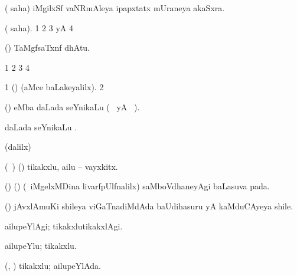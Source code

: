 \bentry
{} 
\gl{\nA}
\bmng
( saha) iMgilxSf vaNRmAleya ipapxtatx mUraneya akaSxra. 
\emng
\eentry

\bentry
{}
\gl{\saMkiSx}
\expl{}
\bmng
( saha). 
\bnum
\num{1}  
\num{2}  
\num{3}  yA  
\num{4}  
\enum
\emng
\eentry

\bentry
{}
\gl{\saMkeV}
\expl{}
\bmng
(\ravi) TaMgfsaTxnf dhAtu. 
\emng
\eentry

\bentry
{}
\gl{\saMkiSx}
\expl{}
\bmng
\bnum
\num{1}  
\num{2}  
\num{3}  
\num{4}  
\enum
\emng
\eentry


\bentry
{}
\gl{\saMkiSx}
\expl{}
\bmng
\bnum
\num{1} (\ame)  (aMce baLakeyalilx). 
\num{2} 
\enum
\emng
\eentry


\bentry
{} 
\gl{\nA}
\expl{}
\bmng
(\ca)  eMba daLada seYnikaLu (\birx\  yA \ame\ ). 
\emng
\eentry


\bentry
{} 
\gl{\nA}
\expl{}
\bmng
{} daLada seYnikaLu . 
\emng
\eentry

\bentry
{}
\gl{\saMkiSx}
\expl{}
\bmng
(\ame dalilx)  
\emng
\eentry

\bentry
{} 
\gl{\nA}
\expl{}
\bmng
(\kanmu\ \ame) (\ashi) tikakxlu, ailu -- vayxkitx. 
\emng
\eentry

\bentry
{} 
\gl{\nA}
\expl{}
\bmng
(\birx) (\pArxM) (\kanmu\ iMgelxMDina livarfpUlfnalilx) saMboVdhaneyAgi baLasuva pada. 
\emng
\eentry

\bentry
{} 
\gl{\nA}
\expl{}
\bmng
(\ca) jAvxlAmuKi shileya viGaTnadiMdAda baUdihasuru yA kaMduCAyeya shile. 
\emng
\eentry

\bentry
{} 
\gl{\kirxvi}
\expl{}
\bmng
ailupeYlAgi; tikakxlutikakxlAgi. 
\emng
\eentry

\bentry
{} 
\gl{\nA}
\expl{}
\bmng
ailupeYlu; tikakxlu. 
\emng
\eentry

\bentry
{} 
\gl{\gu}
\expl{}
\bmng
(\ame, \ashi) tikakxlu; ailupeYlAda. 
\emng
\eentry

